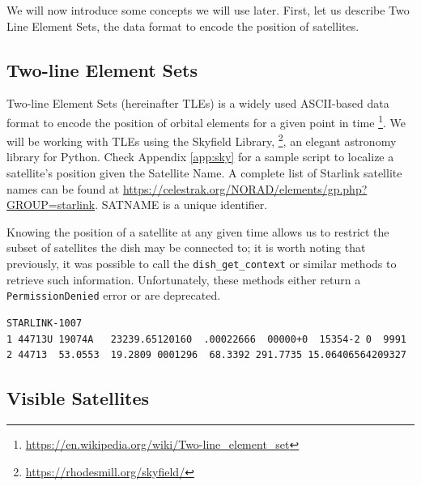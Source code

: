 \documentclass[IN,11pt,twoside,openright,idp,english]{tumthesis}
\begin{document}
We will now introduce some concepts we will use later. First, let us describe Two Line Element Sets, the data format to encode the position of satellites.

\subsection{Two-line Element Sets}

Two-line Element Sets (hereinafter TLEs) is a widely used ASCII-based data format to encode the position of orbital elements for a given point in time \footnote{\url{https://en.wikipedia.org/wiki/Two-line_element_set}}. We will be working with TLEs using the Skyfield Library, \footnote{\url{https://rhodesmill.org/skyfield/}}, an elegant astronomy library for Python. Check Appendix \ref{app:sky} for a sample script to localize a satellite's position given the Satellite Name. A complete list of Starlink satellite names can be found at \url{https://celestrak.org/NORAD/elements/gp.php?GROUP=starlink}. SATNAME is a unique identifier.

Knowing the position of a satellite at any given time allows us to restrict the subset of satellites the dish may be connected to; it is worth noting that previously, it was possible to call the \texttt{dish\_get\_context} or similar methods to retrieve such information. Unfortunately, these methods either return a \texttt{PermissionDenied} error or are deprecated.

\begin{lstlisting}[caption={TLE for satellite STARLINK-1007 },captionpos=b]
STARLINK-1007           
1 44713U 19074A   23239.65120160  .00022666  00000+0  15354-2 0  9991
2 44713  53.0553  19.2809 0001296  68.3392 291.7735 15.06406564209327
\end{lstlisting}

\subsection{Visible Satellites}

\end{document}
